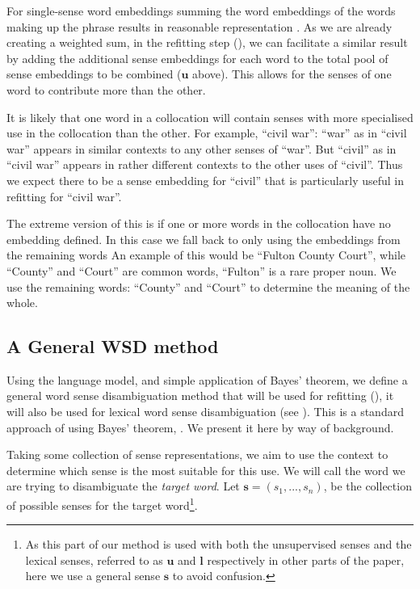 \documentclass{sig-alternate}
\newcommand{\s}{\mathbf{s}}
\renewcommand{\l}{\mathbf{l}}
\renewcommand{\u}{\mathbf{u}}
\begin{document}
For single-sense word embeddings  summing the word embeddings of the words making up the phrase results in reasonable representation \parencite{mikolovSkip, White2015SentVecMeaning}.
As we are already creating a weighted sum, in the refitting step (), we can facilitate a similar result by adding the additional sense embeddings for each word to the total pool of sense embeddings to be combined ($\u$ above). This allows for the senses of one word to contribute more than the other.

It is likely that one word in a collocation will contain senses with more specialised use in the collocation than the other.
For example, \enquote{civil war}: \enquote{war} as in \enquote{civil war} appears in similar contexts to any other senses of \enquote{war}.
But \enquote{civil} as in \enquote{civil war} appears in rather different contexts to the other uses of \enquote{civil}. Thus we expect there to be a sense embedding for \enquote{civil} that is particularly useful in refitting for \enquote{civil war}.


The extreme version of this is if one or more words in the collocation have no embedding defined. In this case we fall back to only using the embeddings from the remaining words An example of this would be ``Fulton County Court'', while ``County'' and ``Court'' are common words, ``Fulton'' is a rare proper noun. We use the remaining words: ``County'' and ``Court'' to determine the meaning of the whole.



\subsection{A General WSD method} \label{generalwsd}
Using the language model, and simple application of Bayes' theorem, we define a general word sense disambiguation method that will be used for refitting (), it will also be used for lexical word sense disambiguation (see ). This is a standard approach of using Bayes' theorem, \parencite{tian2014probabilistic, AdaGrams}. We present it here by way of background.

Taking some collection of sense representations, we aim to use the context to determine which sense is the most suitable for this use.
We will call the word we are trying to disambiguate the \emph{target word}.
Let $\s=(s_{1},...,s_{n})$, be the collection of possible senses for the target word\footnote{As this part of our method is used with both the unsupervised senses and the lexical senses, referred to as $\u$ and $\l$ respectively in other parts of the paper, here we use a general sense $\s$ to avoid confusion.}.
\end{document}
